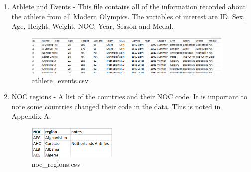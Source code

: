 \documentclass[a4 paper, 12pt]{article}
\begin{document}
        \begin{enumerate}
            \item Athlete and Events - This file contains all of the information recorded about the athlete from all Modern Olympics. The variables of interest are ID, Sex, Age, Height, Weight, NOC, Year, Season and Medal. 
                \begin{figure} [H]
                    \centering
                    \includegraphics[width=0.95\textwidth, frame]
                        {./images/data/athlete_events.png} 
                    \caption{athlete\_events.csv}                  
                \end{figure}            
            \item NOC regions - A list of the countries and their NOC code. It is important to note some countries changed their code in the data. This is noted in Appendix A. 
                \begin{figure}[H]
                    \centering
                    \includegraphics[width=0.4\textwidth, frame]
                    {./images/data/noc_regions.png}   
                    \caption{noc\_regions.csv}                 
            \end{figure}
        \end{enumerate}
\end{document}
